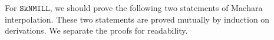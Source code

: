 \documentclass[sn-mathphys-num]{sn-jnl}%
\newcommand{\GG}{\Gamma}
\newcommand{\GD}{\Delta}
\newcommand{\vd}{\vdash}
\newcommand{\SkNMILL}{$\mathtt{SkNMILL}$}
\newcommand{\mf}[1]{\mathsf{#1}}
\newcommand{\gs}[1]{\sigma_{X} (#1)}
\theoremstyle{thmstyleone}%
\newtheorem{theorem}{Theorem}%
\theoremstyle{thmstyletwo}%
\theoremstyle{thmstylethree}%
\begin{document}
For \SkNMILL, we should prove the following two statements of Maehara interpolation.
\genIntrp
These two statements are proved mutually by induction on derivations.
We separate the proofs for readability.
\end{document}
